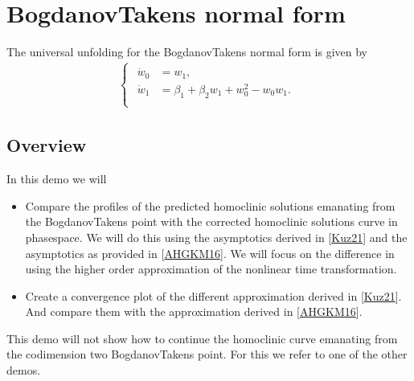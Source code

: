 \documentclass[letterpaper,10pt,english]{jupyterBook}
\begin{document}
\chapter{Bogdanov\sphinxhyphen{}Takens normal form}
\label{\detokenize{BogdanovTakens:bogdanov-takens-normal-form}}\label{\detokenize{BogdanovTakens::doc}}
\sphinxAtStartPar
The universal unfolding for the Bogdanov\sphinxhyphen{}Takens normal form is given by
\begin{equation}\label{equation:BogdanovTakens:eq:BogdanovTakensNormalForm}
\begin{split}\begin{cases}
\begin{aligned}
\dot w_0 &= w_1, \\
\dot w_1 &= \beta_1  + \beta_2 w_1 + w_0^2 - w_0 w_1. \\
\end{aligned}
\end{cases}\end{split}
\end{equation}

\section{Overview}
\label{\detokenize{BogdanovTakens:overview}}
\sphinxAtStartPar
In this demo we will
\begin{itemize}
\item {} 
\sphinxAtStartPar
Compare the profiles of the predicted homoclinic solutions emanating from the
Bogdanov\sphinxhyphen{}Takens point with the corrected homoclinic solutions curve in
phase\sphinxhyphen{}space. We will do this using the asymptotics derived in
{[}\hyperlink{cite.references:id3}{Kuz21}{]} and the asymptotics as provided in
{[}\hyperlink{cite.references:id2}{AHGKM16}{]}. We will focus on the difference in using the higher
order approximation of the non\sphinxhyphen{}linear time transformation.

\item {} 
\sphinxAtStartPar
Create a convergence plot of the different approximation
derived in {[}\hyperlink{cite.references:id3}{Kuz21}{]}. And compare them with the approximation
derived in {[}\hyperlink{cite.references:id2}{AHGKM16}{]}.

\end{itemize}

\sphinxAtStartPar
This demo will not show how to continue the homoclinic curve emanating from the
codimension two Bogdanov\sphinxhyphen{}Takens point. For this we refer to one of the other
demos.
\end{document}
